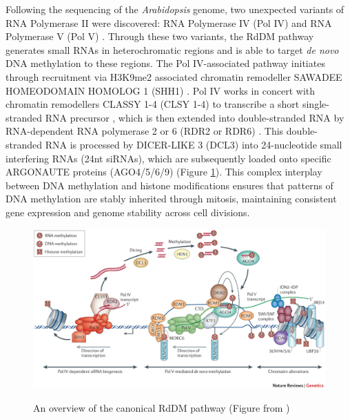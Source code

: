 Following the sequencing of the \textit{Arabidopsis} genome, two unexpected variants of RNA Polymerase II were discovered: RNA Polymerase IV (Pol IV) and RNA Polymerase V (Pol V) \cite{RN115}. Through these two variants, the RdDM pathway generates small RNAs in heterochromatic regions and is able to target \textit{de novo} DNA methylation to these regions. The Pol IV-associated pathway initiates through recruitment via H3K9me2 associated chromatin remodeller SAWADEE HOMEODOMAIN HOMOLOG 1 (SHH1) \cite{RN206,RN98,RN99,RN116}.  Pol IV works in concert with chromatin remodellers CLASSY 1-4 (CLSY 1-4) to transcribe a short single-stranded RNA precursor \cite{RN117}, which is then extended into double-stranded RNA by RNA-dependent RNA polymerase 2 or 6 (RDR2 or RDR6) \cite{RN61,RN33}. This double-stranded RNA is processed by DICER-LIKE 3 (DCL3) into 24-nucleotide small interfering RNAs (24nt siRNAs), which are subsequently loaded onto specific ARGONAUTE proteins (AGO4/5/6/9) \cite{RN33} (Figure \ref{fig:RdDM_overview}). This complex interplay between DNA methylation and histone modifications ensures that patterns of DNA methylation are stably inherited through mitosis, maintaining consistent gene expression and genome stability across cell divisions.

\begin{figure}[htbp!] 
\centering    
    \includegraphics[width=1\textwidth]{Chapter1/Figs/RdDM.png}
\caption{An overview of the canonical RdDM pathway (Figure from \cite{RN33})}
\label{fig:RdDM_overview}
\captionsetup{font=small}
    \caption*{}
\end{figure}

